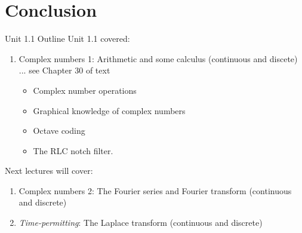 \documentclass{beamer}
\begin{document}
\section{Conclusion}

\begin{frame}{Unit 1.1 Outline}
Unit 1.1 covered:
\begin{enumerate}
\item \alert{Complex numbers 1: Arithmetic and some calculus (continuous and discete) ... see Chapter 30 of text}
\begin{itemize}
\item Complex number operations
\item Graphical knowledge of complex numbers
\item Octave coding
\item The RLC notch filter.
\end{itemize}
\end{enumerate}
Next lectures will cover:
\begin{enumerate}
\item Complex numbers 2: The Fourier series and Fourier transform (continuous and discrete)
\item \textit{Time-permitting}: The Laplace transform (continuous and discrete)
\end{enumerate}
\end{frame}
\end{document}
